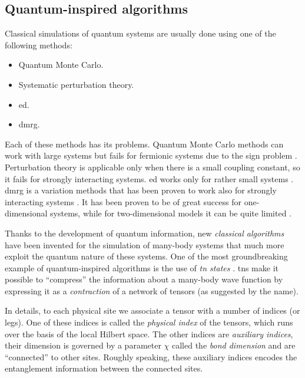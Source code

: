 \subsection{Quantum-inspired algorithms}
\label{sub:quantum_inspired_algorithms}

Classical simulations of quantum systems are usually done using one of the following methods:
\begin{itemize}[itemsep=0pt]
    \item Quantum Monte Carlo.
    \item Systematic perturbation theory.
    \item \Ac{ed}.
    \item \Ac{dmrg}.
\end{itemize}
Each of these methods has its problems.
Quantum Monte Carlo methods can work with large systems but fails for fermionic systems due to the sign problem \cite{sandvik2010computational, troyer2010computational}.
Perturbation theory is applicable only when there is a small coupling constant, so it fails for strongly interacting systems.
\Ac{ed} works only for rather small systems \cite{sandvik2010computational, troyer2010computational}.
\Ac{dmrg} is a variation methods that has been proven to work also for strongly interacting systems \cite{schollwock2011dmrg, mcculloch2007dmrg, dechiara2008dmrg}.
It has been proven to be of great success for one-dimensional systems, while for two-dimensional models it can be quite limited \cite{stoudenmire2012dmrg}.

Thanks to the development of quantum information, new \emph{classical algorithms} have been invented for the simulation of many-body systems that much more exploit the quantum nature of these systems.
One of the most groundbreaking example of quantum-inspired algorithms is the use of \emph{\ac{tn} states} \cite{orus2014tensor, verstraete2004algo, verstraete2008tensor, verstraete2004dmrg, vidal2008simulation, cirac2009tensor}.
\Acp{tn} make it possible to ``compress'' the information about a many-body wave function by expressing it as a \emph{contraction} of a network of tensors (as suggested by the name).

In details, to each physical site we associate a tensor with a number of indices (or legs).
One of these indices is called the \emph{physical index} of the tensors, which runs over the basis of the local Hilbert space.
The other indices are \emph{auxiliary indices}, their dimension is governed by a parameter $\chi$ called the \emph{bond dimension} and are ``connected'' to other sites.
Roughly speaking, these auxiliary indices encodes the entanglement information between the connected sites.

